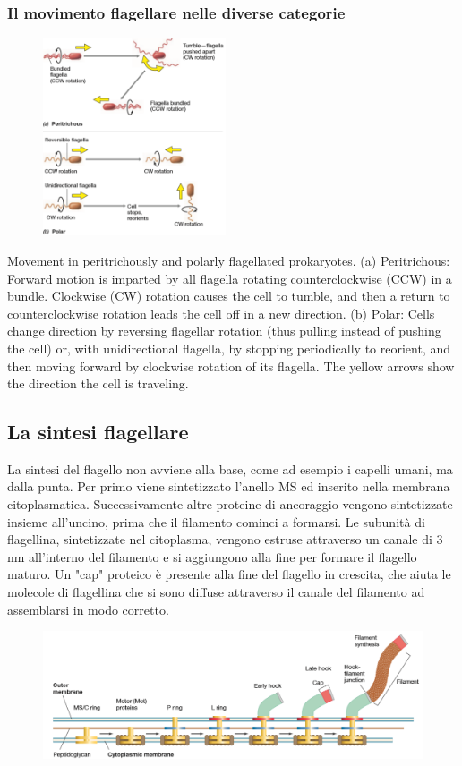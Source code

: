\subsubsection{Il movimento flagellare nelle diverse categorie}
\begin{figure}
  \begin{center}
    \includegraphics[width=0.48\textwidth]{Pictures/18.png}
  \end{center}
\end{figure}
Movement in peritrichously and polarly flagellated prokaryotes.  (a) Peritrichous: Forward motion is imparted by all flagella rotating counterclockwise 
(CCW) in a bundle. Clockwise (CW) rotation causes the cell to tumble, and then a return to counterclockwise rotation leads the cell off in a new direction. 
(b) Polar:  Cells change direction by reversing flagellar rotation (thus pulling instead of pushing the cell) or, with unidirectional flagella, by stopping 
periodically to reorient, and then moving forward by clockwise rotation of its flagella. The yellow arrows show the direction the cell is traveling.
\subsection{La sintesi flagellare}
La sintesi del flagello non avviene alla base, come ad esempio i capelli umani, ma dalla punta. Per primo viene sintetizzato l’anello MS ed inserito nella 
membrana citoplasmatica. Successivamente altre proteine di ancoraggio vengono sintetizzate insieme all’uncino, prima che il filamento cominci a formarsi. Le 
subunità di flagellina, sintetizzate nel citoplasma, vengono estruse attraverso un canale di 3 nm all'interno del filamento e si aggiungono alla fine per 
formare il flagello maturo. Un "cap" proteico è presente alla fine del flagello in crescita, che aiuta le molecole di flagellina che si sono diffuse 
attraverso il canale del filamento ad assemblarsi in modo corretto. 
\begin{figure}[H]
	\includegraphics[width=\textwidth]{Pictures/19.png}
\end{figure}
